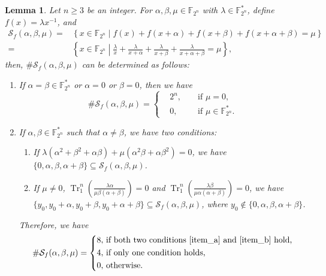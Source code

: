 \documentclass{article}
\newcommand{\F}{\mathbb{F}}
\newcommand{\0}{\textbf{0}}
\newcommand{\1}{\textbf{1}}
\newcommand{\TrN}{\operatorname{Tr}_1^n}
\theoremstyle{plain}
\newtheorem{lemma}{Lemma}
\begin{document}
    \begin{lemma}\label{lemma:num_sol_second_dev}
        Let $n\ge 3$ be an integer.
        For $\alpha,\beta,\mu\in\F_{2^n}$ with $\lambda\in\F_{2^n}^*$, define $f(x)=\lambda x^{-1}$, and
        \begin{align*}
            \mathcal{S}_f(\alpha,\beta,\mu)=&\left\{x\in\F_{2^n}\middle|f(x)+f(x+\alpha)+f(x+\beta)+f(x+\alpha+\beta)=\mu\right\}\\
            =&\left\{ x\in\F_{2^n}\middle|\frac{\lambda}{x}+\frac{\lambda}{x+\alpha}+\frac{\lambda}{x+\beta}+\frac{\lambda}{x+\alpha+\beta}=\mu \right\}, 
        \end{align*}
        then, $\#\mathcal{S}_f(\alpha,\beta,\mu)$ can be determined as follows:
        \begin{enumerate}[label=(\arabic{*})]
            \item If $\alpha=\beta\in\F_{2^n}^*$ or $\alpha=0$ or $\beta=0$, then we have 
            \[\#\mathcal{S}_f(\alpha,\beta,\mu) = \left\{
                \begin{alignedat}{2}
                    &2^n,&&\text{ if }\mu = 0,\\
                    &0,  &&\text{ if }\mu\in\F_{2^n}^*.
                \end{alignedat}\right.\]
            \item If $\alpha,\beta\in\F_{2^n}^*$ such that $\alpha\ne\beta$, we have two conditions:
            \begin{enumerate}[ref=(\alph{*})]
                \item If $\lambda(\alpha^2+\beta^2+\alpha\beta)+\mu(\alpha^2\beta+\alpha\beta^2)=0$, we have
                $\{0,\alpha,\beta,\alpha+\beta\}\subseteq\mathcal{S}_f(\alpha,\beta,\mu)$.\label{item_a}
                \item If $\mu\ne 0$, $\TrN\left(\frac{\lambda\alpha}{\mu \beta(\alpha+\beta)}\right)=0$ and
                $\TrN\left(\frac{\lambda \beta}{\mu \alpha(\alpha+\beta)}\right)=0$, we have
                $\{y_0,y_0+\alpha,y_0+\beta,y_0+\alpha+\beta\}\subseteq\mathcal{S}_f(\alpha,\beta,\mu)$, where $y_0\notin\{0,\alpha,\beta,\alpha+\beta\}$.\label{item_b}
            \end{enumerate}
            Therefore, we have
            \[\#\mathcal{S}_f(\alpha,\beta,\mu) = \left\{
                \begin{alignedat}{2}
                    &8,&&\text{ if both two conditions }\ref{item_a}\text{ and }\ref{item_b}\text{ hold,}\\
                    &4,&&\text{ if only one condition holds,}\\
                    &0,&&\text{ otherwise.}
                \end{alignedat}\right.\]
        \end{enumerate}
    \end{lemma}
\end{document}
